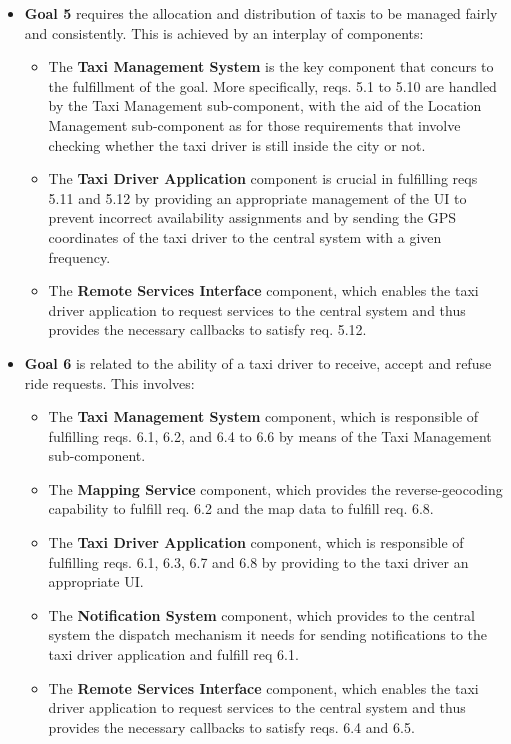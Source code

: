 \begin{itemize}
\begin{itemize}
	\end{itemize}
	\item \textbf{Goal 5} requires the allocation and distribution of taxis to be managed fairly and consistently. This is achieved by an interplay of components: 
	\begin{itemize}
	\item The \textbf{Taxi Management System} is the key component that concurs to the fulfillment of the goal. More specifically, reqs. 5.1 to 5.10 are handled by the Taxi Management sub-component, with the aid of the Location Management sub-component as for those requirements that involve checking whether the taxi driver is still inside the city or not. 
	\item The \textbf{Taxi Driver Application} component is crucial in fulfilling reqs 5.11 and 5.12 by providing an appropriate management of the UI to prevent incorrect availability assignments and by sending the GPS coordinates of the taxi driver to the central system with a given frequency.
	\item The \textbf{Remote Services Interface} component, which enables the taxi driver application to request services to the central system and thus provides the necessary callbacks to satisfy req. 5.12. 	
	\end{itemize}
	\item \textbf{Goal 6} is related to the ability of a taxi driver to receive, accept and refuse ride requests. This involves:
	\begin{itemize}
	\item The \textbf{Taxi Management System} component, which is responsible of fulfilling reqs. 6.1, 6.2, and 6.4 to 6.6 by means of the Taxi Management sub-component.
	\item The \textbf{Mapping Service} component, which provides the reverse-geocoding capability to fulfill req. 6.2 and the map data to fulfill req. 6.8.
	\item The \textbf{Taxi Driver Application} component, which is responsible of fulfilling reqs. 6.1, 6.3, 6.7 and 6.8 by providing to the taxi driver an appropriate UI.
	\item The \textbf{Notification System} component, which provides to the central system the dispatch mechanism it needs for sending notifications to the taxi driver application and fulfill req 6.1.
	\item The \textbf{Remote Services Interface} component, which enables the taxi driver application to request services to the central system and thus provides the necessary callbacks to satisfy reqs. 6.4 and 6.5.

\end{itemize}
\end{itemize}
